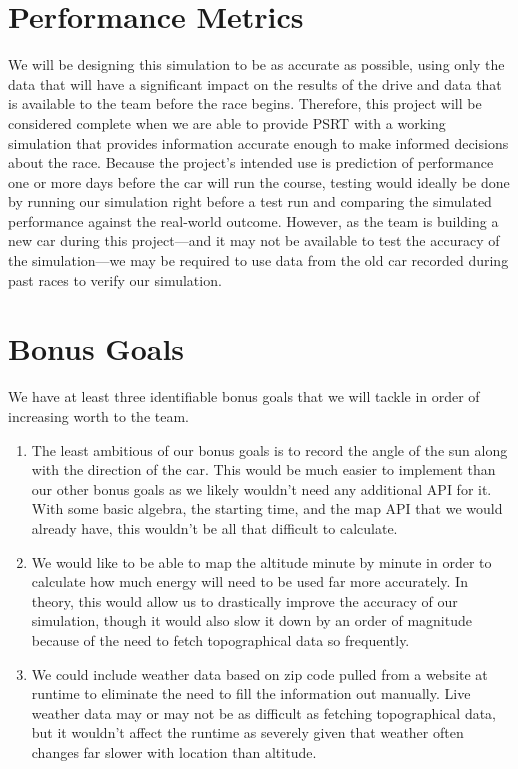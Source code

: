 \documentclass[onecolumn, draftclsnofoot,10pt, compsoc]{IEEEtran}
\begin{document}
\section{Performance Metrics }
We will be designing this simulation to be as accurate as possible, using only the data that will have a significant impact on the results of the drive and data that is available to the team before the race begins. Therefore, this project will be considered complete when we are able to provide PSRT with a working simulation that provides information accurate enough to make informed decisions about the race. 
Because the project's intended use is prediction of performance one or more days before the car will run the course, testing would ideally be done by running our simulation right before a test run and comparing the simulated performance against the real-world outcome. 
However, as the team is building a new car during this project---and it may not be available to test the accuracy of the simulation---we may be required to use data from the old car recorded during past races to verify our simulation. 

\section{Bonus Goals}
We have at least three identifiable bonus goals that we will tackle in order of increasing worth to the team.
\begin{enumerate}
\item The least ambitious of our bonus goals is to record the angle of the sun along with the direction of the car. 
This would be much easier to implement than our other bonus goals as we likely wouldn't need any additional API for it.
With some basic algebra, the starting time, and the map API that we would already have, this wouldn't be all that difficult to calculate. 
\item We would like to be able to map the altitude minute by minute in order to calculate how much energy will need to be used far more accurately. 
In theory, this would allow us to drastically improve the accuracy of our simulation, though it would also slow it down by an order of magnitude because of the need to fetch topographical data so frequently. 
\item We could include weather data based on zip code pulled from a website at runtime to eliminate the need to fill the information out manually. Live weather data may or may not be as difficult as fetching topographical data, but it wouldn't affect the runtime as severely given that weather often changes far slower with location than altitude.
\end{enumerate}
\end{document}

